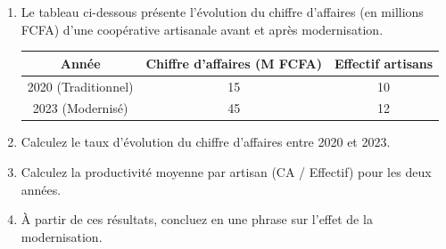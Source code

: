 \documentclass[11pt]{article}
\begin{document}
\begin{exercice}
\begin{enumerate}
    \item Le tableau ci-dessous présente l'évolution du chiffre d'affaires (en millions FCFA) d'une coopérative artisanale avant et après modernisation.
    
    \begin{tabular}{|c|c|c|}
    \hline
    \textbf{Année} & \textbf{Chiffre d'affaires (M FCFA)} & \textbf{Effectif artisans} \\
    \hline
    2020 (Traditionnel) & 15 & 10 \\
    \hline
    2023 (Modernisé) & 45 & 12 \\
    \hline
    \end{tabular}
    
    \item Calculez le taux d'évolution du chiffre d'affaires entre 2020 et 2023.
    \item Calculez la productivité moyenne par artisan (CA / Effectif) pour les deux années.
    \item À partir de ces résultats, concluez en une phrase sur l'effet de la modernisation.
\end{enumerate}
\end{exercice}
\end{document}
